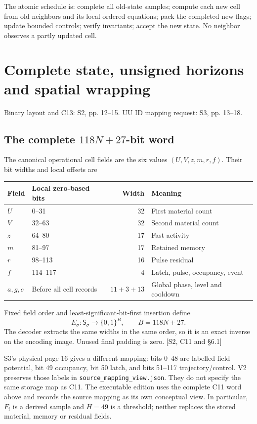 \documentclass[11pt,a4paper]{article}
\numberwithin{equation}{section}
\newcommand{\newsec}[1]{\clearpage\section{#1}}
\newcommand{\src}[2]{{\sffamily\small\color{slate}[#1, #2]}}
\newcommand{\origin}[1]{{\sffamily\small\color{slate}#1}\par\vspace{3pt}}
\begin{document}
The atomic schedule is: complete all old-state samples; compute each new cell from old neighbors and its local ordered equations; pack the completed new flags; update bounded controls; verify invariants; accept the new state. No neighbor observes a partly updated cell.

\newsec{Complete state, unsigned horizons and spatial wrapping}
\label{sec:representation}
\origin{Binary layout and C13: S2, pp. 12--15. UU ID mapping request: S3, pp. 13--18.}

\subsection{The complete $118N+27$-bit word}
The canonical operational cell fields are the six values $(U,V,z,m,r,f)$. Their bit widths and local offsets are
\begin{center}
\begin{tabular}{@{}llrl@{}}
\toprule\textbf{Field} & \textbf{Local zero-based bits} & \textbf{Width} & \textbf{Meaning}\\\midrule
$U$ & 0--31 & 32 & First material count\\
$V$ & 32--63 & 32 & Second material count\\
$z$ & 64--80 & 17 & Fast activity\\
$m$ & 81--97 & 17 & Retained memory\\
$r$ & 98--113 & 16 & Pulse residual\\
$f$ & 114--117 & 4 & Latch, pulse, occupancy, event\\\midrule
$a,g,c$ & Before all cell records & $11+3+13$ & Global phase, level and cooldown\\
\bottomrule
\end{tabular}
\end{center}
Fixed field order and least-significant-bit-first insertion define
\begin{equation}
E_\sigma:\mathsf S_\sigma\longrightarrow\{0,1\}^B,
\qquad B=118N+27.
\end{equation}
The decoder extracts the same widths in the same order, so it is an exact inverse on the encoding image. Unused final padding is zero. \src{S2}{C11 and \S6.1}

S3's physical page 16 gives a different mapping: bits 0--48 are labelled field potential, bit 49 occupancy, bit 50 latch, and bits 51--117 trajectory/control. V2 preserves those labels in \texttt{source\_mapping\_view.json}. They do not specify the same storage map as C11. The executable edition uses the complete C11 word above and records the source mapping as its own conceptual view. In particular, $F_i$ is a derived sample and $H=49$ is a threshold; neither replaces the stored material, memory or residual fields.
\end{document}
